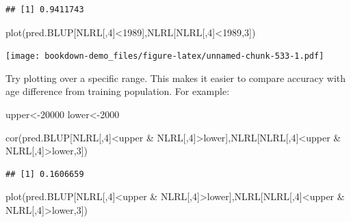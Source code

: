 \documentclass[
]{book}
\newenvironment{Shaded}{\begin{snugshade}}{\end{snugshade}}
\newcommand{\DecValTok}[1]{\textcolor[rgb]{0.00,0.00,0.81}{#1}}
\newcommand{\FunctionTok}[1]{\textcolor[rgb]{0.00,0.00,0.00}{#1}}
\newcommand{\NormalTok}[1]{#1}
\newcommand{\OtherTok}[1]{\textcolor[rgb]{0.56,0.35,0.01}{#1}}
\newcommand{\SpecialCharTok}[1]{\textcolor[rgb]{0.00,0.00,0.00}{#1}}
\begin{document}
\begin{verbatim}
## [1] 0.9411743
\end{verbatim}

\begin{Shaded}
\begin{Highlighting}[]
\FunctionTok{plot}\NormalTok{(pred.BLUP[NLRL[,}\DecValTok{4}\NormalTok{]}\SpecialCharTok{\textless{}}\DecValTok{1989}\NormalTok{],NLRL[NLRL[,}\DecValTok{4}\NormalTok{]}\SpecialCharTok{\textless{}}\DecValTok{1989}\NormalTok{,}\DecValTok{3}\NormalTok{])}
\end{Highlighting}
\end{Shaded}

\texttt{[image: bookdown-demo\_files/figure-latex/unnamed-chunk-533-1.pdf]}

Try plotting over a specific range. This makes it easier to compare accuracy with age
difference from training population. For example:

\begin{Shaded}
\begin{Highlighting}[]
\NormalTok{upper}\OtherTok{\textless{}{-}}\DecValTok{20000}
\NormalTok{lower}\OtherTok{\textless{}{-}}\DecValTok{2000}

\FunctionTok{cor}\NormalTok{(pred.BLUP[NLRL[,}\DecValTok{4}\NormalTok{]}\SpecialCharTok{\textless{}}\NormalTok{upper }\SpecialCharTok{\&}\NormalTok{ NLRL[,}\DecValTok{4}\NormalTok{]}\SpecialCharTok{\textgreater{}}\NormalTok{lower],NLRL[NLRL[,}\DecValTok{4}\NormalTok{]}\SpecialCharTok{\textless{}}\NormalTok{upper }\SpecialCharTok{\&}
\NormalTok{NLRL[,}\DecValTok{4}\NormalTok{]}\SpecialCharTok{\textgreater{}}\NormalTok{lower,}\DecValTok{3}\NormalTok{])}
\end{Highlighting}
\end{Shaded}

\begin{verbatim}
## [1] 0.1606659
\end{verbatim}

\begin{Shaded}
\begin{Highlighting}[]
\FunctionTok{plot}\NormalTok{(pred.BLUP[NLRL[,}\DecValTok{4}\NormalTok{]}\SpecialCharTok{\textless{}}\NormalTok{upper }\SpecialCharTok{\&}\NormalTok{ NLRL[,}\DecValTok{4}\NormalTok{]}\SpecialCharTok{\textgreater{}}\NormalTok{lower],NLRL[NLRL[,}\DecValTok{4}\NormalTok{]}\SpecialCharTok{\textless{}}\NormalTok{upper }\SpecialCharTok{\&}
\NormalTok{NLRL[,}\DecValTok{4}\NormalTok{]}\SpecialCharTok{\textgreater{}}\NormalTok{lower,}\DecValTok{3}\NormalTok{])}
\end{Highlighting}
\end{Shaded}
\end{document}
